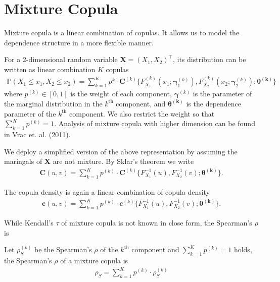 \section{Mixture Copula}\label{sec:mixture-copula}
Mixture copula is a linear combination of copulas.
It allows us to model the dependence structure in a more flexible manner.

For a 2-dimensional random variable $\bm{X}=(X_1,X_2)^\intercal$,
its distribution can be written as linear combination $K$ copulas
\begin{align}
    \mathbb{P}(X_1 \leq x_1, X_2 \leq x_2) = \sum_{k=1}^K p^k \cdot \bm{C}^{(k)}\{F^{(k)}_{X_1}(x_1;\bm{\gamma}^{(k)}_1),
    F^{(k)}_{X_2}(x_2;\bm{\gamma}^{(k)}_2); \bm{\theta^{(k)}}\}
    \end{align}
where $p^{(k)} \in [0,1]$ is the weight of each component,
$\bm{\gamma}^{(k)}$ is the parameter of the marginal distribution in the $k^\text{th}$ component,
and $\bm{\theta^{(k)}}$ is the dependence parameter of the $k^\text{th}$ component.
We also restrict the weight so that $\sum_{k=1}^K p^{(k)}=1$.
Analysis of mixture copula with higher dimension can be found in Vrac et. al. (2011).

We deploy a simplified version of the above representation by assuming the maringals of $\bm{X}$ are not mixture.
By Sklar's theorem we write
\begin{align}
    \bm{C}(u,v)= \sum_{k=1}^K p^{(k)} \cdot \bm{C}^{(k)}\{F^{-1}_{X_1}(u),
    F^{-1}_{X_2}(v); \bm{\theta^{(k)}}\}.
    \end{align}\medskip

The copula density is again a linear combination of copula density
\begin{align}
    \bm{c}(u,v)= \sum_{k=1}^K p^{(k)} \cdot \bm{c}^{(k)}\{F^{-1}_{X_1}(u),
    F^{-1}_{X_2}(v); \bm{\theta^{(k)}}\}.
    \end{align}\medskip

While Kendall's $\tau$ of mixture copula is not known in close form,
the Spearman's $\rho$ is

\begin{proposition}
    Let $\rho_S^{(k)}$ be the Spearman's $\rho$ of the $k^\text{th}$ component and $\sum_{k=1}^K p^{(k)}=1$ holds,
    the Spearman's $\rho$ of a mixture copula is
    \begin{align}
        \rho_S = \sum_{k=1}^K p^{(k)} \cdot \rho_S^{(k)}
        \end{align}
    \end{proposition}

